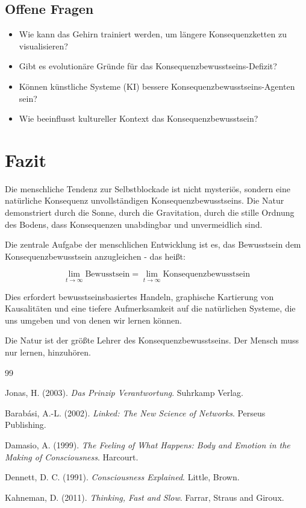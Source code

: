 \documentclass[12pt,a4paper]{article}
\begin{document}
\subsection{Offene Fragen}

\begin{itemize}
    \item Wie kann das Gehirn trainiert werden, um längere Konsequenzketten zu visualisieren?
    \item Gibt es evolutionäre Gründe für das Konsequenzbewusstseins-Defizit?
    \item Können künstliche Systeme (KI) bessere Konsequenzbewusstseins-Agenten sein?
    \item Wie beeinflusst kultureller Kontext das Konsequenzbewusstsein?
\end{itemize}

\section{Fazit}

Die menschliche Tendenz zur Selbstblockade ist nicht mysteriös, sondern eine natürliche Konsequenz unvollständigen Konsequenzbewusstseins. Die Natur demonstriert durch die Sonne, durch die Gravitation, durch die stille Ordnung des Bodens, dass Konsequenzen unabdingbar und unvermeidlich sind.

Die zentrale Aufgabe der menschlichen Entwicklung ist es, das Bewusstsein dem Konsequenzbewusstsein anzugleichen - das heißt:

\begin{equation}
\lim_{t \to \infty} \text{Bewusstsein} = \lim_{t \to \infty} \text{Konsequenzbewusstsein}
\end{equation}

Dies erfordert bewusstseinsbasiertes Handeln, graphische Kartierung von Kausalitäten und eine tiefere Aufmerksamkeit auf die natürlichen Systeme, die uns umgeben und von denen wir lernen können.

Die Natur ist der größte Lehrer des Konsequenzbewusstseins. Der Mensch muss nur lernen, hinzuhören.

\begin{thebibliography}{99}

 Jonas, H. (2003). \textit{Das Prinzip Verantwortung}. Suhrkamp Verlag.

 Barabási, A.-L. (2002). \textit{Linked: The New Science of Networks}. Perseus Publishing.

 Damasio, A. (1999). \textit{The Feeling of What Happens: Body and Emotion in the Making of Consciousness}. Harcourt.

 Dennett, D. C. (1991). \textit{Consciousness Explained}. Little, Brown.

 Kahneman, D. (2011). \textit{Thinking, Fast and Slow}. Farrar, Straus and Giroux.

\end{thebibliography}
\end{document}
